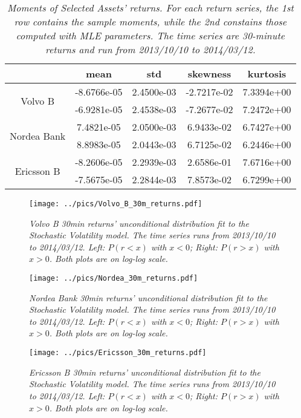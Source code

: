 \begin{table}[htb!]
  \centering
  \begin{tabular}{|c|c|c|c|c|}
    \hline
    & mean & std & skewness & kurtosis \\
    \hline
    \multirow{2}{*}{Volvo B} & -8.6766e-05 & 2.4500e-03 &
    -2.7217e-02 & 7.3394e+00 \\
    & -6.9281e-05 & 2.4538e-03 & -7.2677e-02 & 7.2472e+00 \\
    \hline
    \multirow{2}{*}{Nordea Bank} & 7.4821e-05 & 2.0500e-03 &
    6.9433e-02 & 6.7427e+00 \\
    & 8.8983e-05 & 2.0443e-03 & 6.7125e-02 & 6.2446e+00 \\
    \hline
    \multirow{2}{*}{Ericsson B} & -8.2606e-05 & 2.2939e-03 &
    2.6586e-01 & 7.6716e+00 \\
    & -7.5675e-05 & 2.2844e-03 & 7.8573e-02 & 6.7299e+00 \\
    \hline
  \end{tabular}
  \caption{\small \it Moments of Selected Assets' returns. For each return
    series, the 1st row contains the sample moments, while the 2nd
    constains those computed with MLE parameters. The time series are
    30-minute returns and run from 2013/10/10 to 2014/03/12.}
  \label{tab:assets_moments}
\end{table}

\begin{figure}[htb!]
  \centering
  \texttt{[image: ../pics/Volvo\_B\_30m\_returns.pdf]}
  \caption{\small \it Volvo B 30min returns' unconditional distribution fit to
    the Stochastic Volatility model. The time series runs from
    2013/10/10 to 2014/03/12. Left: $P(r < x)$ with $x < 0$; Right:
    $P(r > x)$ with $x > 0$. Both plots are on log-log scale.}
  \label{fig:Volvo_B_30m_returns}
\end{figure}

\begin{figure}[htb!]
  \centering
  \texttt{[image: ../pics/Nordea\_30m\_returns.pdf]}
  \caption{\small \it Nordea Bank 30min returns' unconditional
    distribution fit to the Stochastic Volatility model. The time
    series runs from 2013/10/10 to 2014/03/12. Left: $P(r < x)$ with
    $x < 0$; Right: $P(r > x)$ with $x > 0$. Both plots are on log-log scale.}
  \label{fig:Nordea_30m_returns}
\end{figure}

\begin{figure}[htb!]
  \centering
  \texttt{[image: ../pics/Ericsson\_30m\_returns.pdf]}
  \caption{\small \it Ericsson B 30min returns' unconditional
    distribution fit to the Stochastic Volatility model. The time
    series runs from 2013/10/10 to 2014/03/12. Left: $P(r < x)$ with
    $x < 0$; Right: $P(r > x)$ with $x > 0$. Both plots are on log-log scale.}
  \label{fig:Ericsson_30m_returns}
\end{figure}

